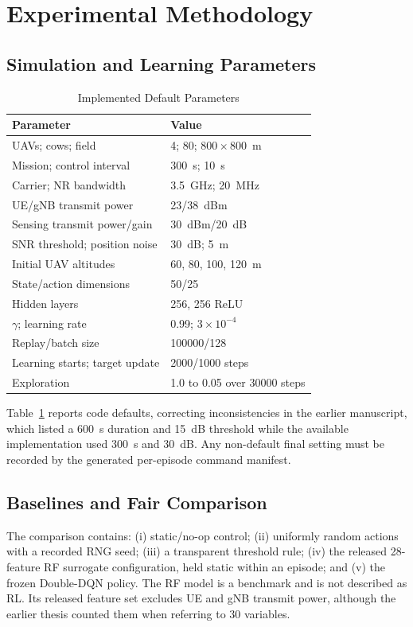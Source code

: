 \documentclass[10pt,conference]{IEEEtran}
\begin{document}
\section{Experimental Methodology}

\subsection{Simulation and Learning Parameters}

\begin{table}[t]
\caption{Implemented Default Parameters}
\label{tab:params}
\centering
\scriptsize
\begin{tabular}{ll}
\toprule
Parameter & Value\\
\midrule
UAVs; cows; field & 4; 80; $800\times800$~m\\
Mission; control interval & 300~s; 10~s\\
Carrier; NR bandwidth & 3.5~GHz; 20~MHz\\
UE/gNB transmit power & 23/38~dBm\\
Sensing transmit power/gain & 30~dBm/20~dB\\
SNR threshold; position noise & 30~dB; 5~m\\
Initial UAV altitudes & 60, 80, 100, 120~m\\
State/action dimensions & 50/25\\
Hidden layers & 256, 256 ReLU\\
$\gamma$; learning rate & 0.99; $3\times10^{-4}$\\
Replay/batch size & 100000/128\\
Learning starts; target update & 2000/1000 steps\\
Exploration & 1.0 to 0.05 over 30000 steps\\
\bottomrule
\end{tabular}
\end{table}

Table~\ref{tab:params} reports code defaults, correcting inconsistencies in the
earlier manuscript, which listed a 600~s duration and 15~dB threshold while the
available implementation used 300~s and 30~dB. Any non-default final setting
must be recorded by the generated per-episode command manifest.

\subsection{Baselines and Fair Comparison}

The comparison contains: (i) static/no-op control; (ii) uniformly random
actions with a recorded RNG seed; (iii) a transparent threshold rule; (iv) the
released 28-feature RF surrogate configuration, held static within an episode;
and (v) the frozen Double-DQN policy. The RF model is a benchmark and is not
described as RL. Its released feature set excludes UE and gNB transmit power,
although the earlier thesis counted them when referring to 30 variables.
\end{document}
